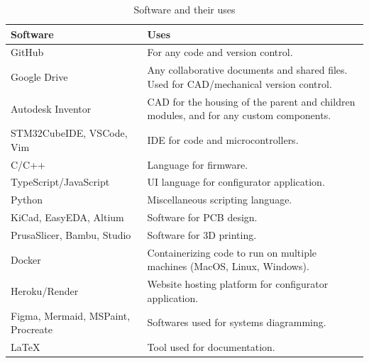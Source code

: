 \documentclass[a4]{article}
\begin{document}
\begin{table}[h!]
	\centering
	\renewcommand{\arraystretch}{1.2} %
	\centering
	\begin{tabularx}{\linewidth}{|Y|Y|}
		\hline
		\textcolor{McMasterMaroon}{\textbf{Software}} & \textcolor{McMasterMaroon}{\textbf{Uses}}                                              \\
		\hline
		GitHub                                        & For any code and version control.                                                      \\
		\hline
		Google Drive                                  & Any collaborative documents and shared files. Used for CAD/mechanical version control. \\
		\hline
		Autodesk Inventor                             & CAD for the housing of the parent and children modules, and for any custom components. \\
		\hline
		STM32CubeIDE, VSCode, Vim                     & IDE for code and microcontrollers.                                                     \\
		\hline
		C/C++                                         & Language for firmware.                                                                 \\
		\hline
		TypeScript/JavaScript                         & UI language for configurator application.                                              \\
		\hline
		Python                                        & Miscellaneous scripting language.                                                      \\
		\hline
		KiCad, EasyEDA, Altium                        & Software for PCB design.                                                               \\
		\hline
		PrusaSlicer, Bambu, Studio                    & Software for 3D printing.                                                              \\
		\hline
		Docker                                        & Containerizing code to run on multiple machines (MacOS, Linux, Windows).               \\
		\hline
		Heroku/Render                                 & Website hosting platform for configurator application.                                 \\
		\hline
		Figma, Mermaid, MSPaint, Procreate            & Softwares used for systems diagramming.                                                \\
		\hline
		LaTeX                                         & Tool used for documentation.                                                           \\
		\hline
	\end{tabularx}
	\caption{Software and their uses}
\end{table}
\end{document}
